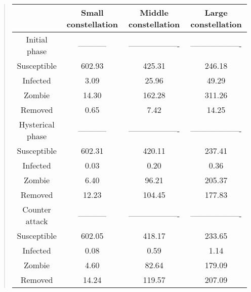 \documentclass[%
twoside,                 %
final,                   %
chapterprefix=true,      %
open=right               %
10pt]{book}
\begin{document}





\label{table:compare_towns}

\begin{quote}
\begin{tabular}{cccc}
\hline
\multicolumn{1}{c}{  } & \multicolumn{1}{c}{ Small constellation } & \multicolumn{1}{c}{ Middle constellation } & \multicolumn{1}{c}{ Large constellation } \\
\hline
Initial phase    & -----------         & -------------------  & ------------------- \\
\hline
Susceptible      & 602.93              & 425.31               & 246.18              \\
Infected         & 3.09                & 25.96                & 49.29               \\
Zombie           & 14.30               & 162.28               & 311.26              \\
Removed          & 0.65                & 7.42                 & 14.25               \\
\hline
Hysterical phase & -----------         & -------------------  & ------------------- \\
\hline
Susceptible      & 602.31              & 420.11               & 237.41              \\
Infected         & 0.03                & 0.20                 & 0.36                \\
Zombie           & 6.40                & 96.21                & 205.37              \\
Removed          & 12.23               & 104.45               & 177.83              \\
\hline
Counter attack   & -----------         & -------------------  & ------------------- \\
\hline
Susceptible      & 602.05              & 418.17               & 233.65              \\
Infected         & 0.08                & 0.59                 & 1.14                \\
Zombie           & 4.60                & 82.64                & 179.09              \\
Removed          & 14.24               & 119.57               & 207.09              \\
\hline
\end{tabular}
\end{quote}
\end{document}
